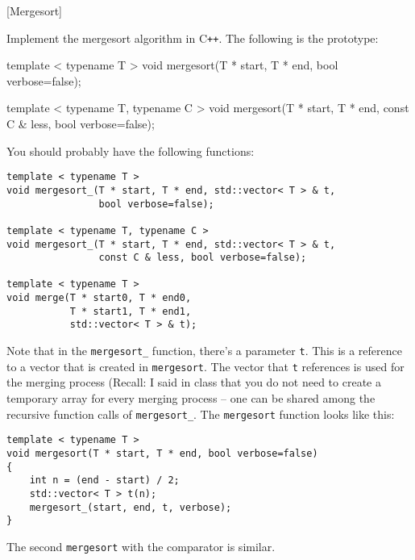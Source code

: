 [Mergesort]

Implement the mergesort algorithm in C\texttt{++}.
The following is the prototype:

\begin{console}[frame=single, fontsize=\footnotesize]
template < typename T >
void mergesort(T * start, T * end, bool verbose=false);

template < typename T, typename C >
void mergesort(T * start, T * end, const C & less, bool verbose=false);
\end{console}

You should probably have the following functions:
\begin{Verbatim}[frame=single, commandchars=\~\!\@, fontsize=\footnotesize]
template < typename T >
void mergesort_(T * start, T * end, std::vector< T > & t,
                bool verbose=false);

template < typename T, typename C >
void mergesort_(T * start, T * end, std::vector< T > & t,
                const C & less, bool verbose=false);

template < typename T >
void merge(T * start0, T * end0,
           T * start1, T * end1,
           std::vector< T > & t);
\end{Verbatim}
Note that in the \verb!mergesort_! function, there's a parameter
\verb!t!.
This is a reference to a vector that is created in
\verb!mergesort!.
The vector that \verb!t! references is used for the merging process
(Recall: I said in class that you do not need to create a temporary
array for every merging process -- one can be shared among the
recursive function calls of \verb!mergesort_!.
The \verb!mergesort! function looks like this:
\begin{Verbatim}[frame=single,commandchars=\~\!\@, fontsize=\footnotesize]
template < typename T >
void mergesort(T * start, T * end, bool verbose=false)
{
    int n = (end - start) / 2;
    std::vector< T > t(n);
    mergesort_(start, end, t, verbose);
}
\end{Verbatim}
The second \verb!mergesort! with the comparator is similar.

